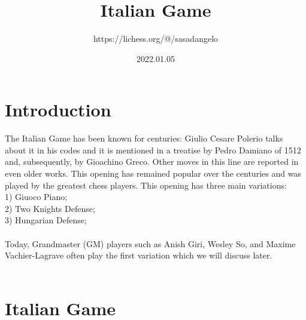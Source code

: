 \documentclass{article}
\title{Italian Game}
\author{https://lichess.org/@/sasadangelo}
\date{2022.01.05}
\begin{document}
\begin{titlepage}
\maketitle
\end{titlepage}
\section{ Introduction}

The Italian Game has been known for centuries: Giulio Cesare Polerio talks about it in his codes and it is mentioned in a treatise by Pedro Damiano of 1512 and, subsequently, by Gioachino Greco. Other moves in this line are reported in even older works. This opening has remained popular over the centuries and was played by the greatest chess players. This opening has three main variations:\\1) Giuoco Piano;\\2) Two Knights Defense;\\3) Hungarian Defense;\\\\Today, Grandmaster (GM) players such as Anish Giri, Wesley So, and Maxime Vachier-Lagrave often play the first variation which we will discuss later.\\
\\
\section{ Italian Game}
\end{document}
